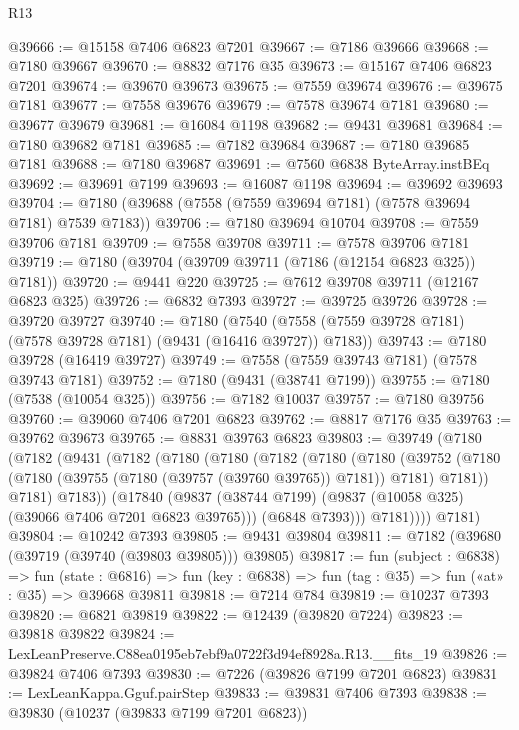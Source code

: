 \begin{lexlean}{R13}
\begin{coremodule}
@39666 := @15158 @7406 @6823 @7201
@39667 := @7186 @39666
@39668 := @7180 @39667
@39670 := @8832 @7176 @35
@39673 := @15167 @7406 @6823 @7201
@39674 := @39670 @39673
@39675 := @7559 @39674
@39676 := @39675 @7181
@39677 := @7558 @39676
@39679 := @7578 @39674 @7181
@39680 := @39677 @39679
@39681 := @16084 @1198
@39682 := @9431 @39681
@39684 := @7180 @39682 @7181
@39685 := @7182 @39684
@39687 := @7180 @39685 @7181
@39688 := @7180 @39687
@39691 := @7560 @6838 ByteArray.instBEq
@39692 := @39691 @7199
@39693 := @16087 @1198
@39694 := @39692 @39693
@39704 := @7180 (@39688 (@7558 (@7559 @39694 @7181) (@7578 @39694 @7181) @7539 @7183))
@39706 := @7180 @39694 @10704
@39708 := @7559 @39706 @7181
@39709 := @7558 @39708
@39711 := @7578 @39706 @7181
@39719 := @7180 (@39704 (@39709 @39711 (@7186 (@12154 @6823 @325)) @7181))
@39720 := @9441 @220
@39725 := @7612 @39708 @39711 (@12167 @6823 @325)
@39726 := @6832 @7393
@39727 := @39725 @39726
@39728 := @39720 @39727
@39740 := @7180
    (@7540 (@7558 (@7559 @39728 @7181) (@7578 @39728 @7181) (@9431 (@16416 @39727)) @7183))
@39743 := @7180 @39728 (@16419 @39727)
@39749 := @7558 (@7559 @39743 @7181) (@7578 @39743 @7181)
@39752 := @7180 (@9431 (@38741 @7199))
@39755 := @7180 (@7538 (@10054 @325))
@39756 := @7182 @10037
@39757 := @7180 @39756
@39760 := @39060 @7406 @7201 @6823
@39762 := @8817 @7176 @35
@39763 := @39762 @39673
@39765 := @8831 @39763 @6823
@39803 := @39749
    (@7180
      (@7182
        (@9431
          (@7182
            (@7180
              (@7180
                (@7182
                  (@7180
                    (@7180
                      (@39752
                        (@7180 (@7180 (@39755 (@7180 (@39757 (@39760 @39765)) @7181)) @7181) @7181))
                      @7181)
                    @7183))
                (@17840
                  (@9837 (@38744 @7199) (@9837 (@10058 @325) (@39066 @7406 @7201 @6823 @39765)))
                  (@6848 @7393)))
              @7181))))
      @7181)
@39804 := @10242 @7393
@39805 := @9431 @39804
@39811 := @7182 (@39680 (@39719 (@39740 (@39803 @39805))) @39805)
@39817 := fun (subject : @6838) =>
  fun (state : @6816) => fun (key : @6838) => fun (tag : @35) => fun («at» : @35) => @39668 @39811
@39818 := @7214 @784
@39819 := @10237 @7393
@39820 := @6821 @39819
@39822 := @12439 (@39820 @7224)
@39823 := @39818 @39822
@39824 := LexLeanPreserve.C88ea0195eb7ebf9a0722f3d94ef8928a.R13.__fits_19
@39826 := @39824 @7406 @7393
@39830 := @7226 (@39826 @7199 @7201 @6823)
@39831 := LexLeanKappa.Gguf.pairStep
@39833 := @39831 @7406 @7393
@39838 := @39830 (@10237 (@39833 @7199 @7201 @6823))

\end{coremodule}
\end{lexlean}
